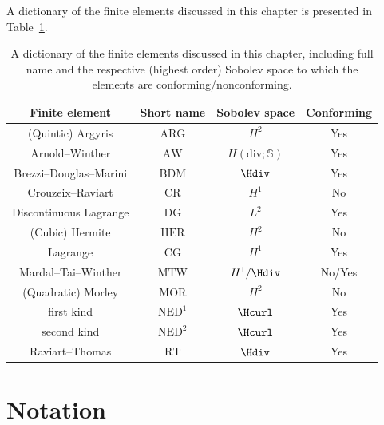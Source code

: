 A dictionary of the finite elements discussed in this chapter is
presented in Table~\ref{kirby-6:tab:overview}.
\begin{table}
  \centering
  \begin{tabular}{cccc}
    \toprule
    Finite element & Short name & Sobolev space & Conforming\\
    \midrule
    (Quintic) Argyris & $\mathrm{ARG}$ & $H^2$ &Yes \\
    Arnold--Winther & $\mathrm{AW}$ & $H(\mathrm{div}; \mathbb{S})$ &Yes \\
    Brezzi--Douglas--Marini & $\mathrm{BDM}$ & $\Hdiv$ & Yes \\
    Crouzeix--Raviart & $\mathrm{CR}$ & $H^1$ & No \\
    Discontinuous Lagrange & $\mathrm{DG}$ & $L^2$ & Yes \\
    (Cubic) Hermite & $\mathrm{HER}$ & $H^2$ & No \\
    Lagrange & $\mathrm{CG}$ & $H^1$ & Yes \\
    Mardal--Tai--Winther & $\mathrm{MTW}$ & $H^1/\Hdiv$ & No/Yes \\
    (Quadratic) Morley & $\mathrm{MOR}$ & $H^2$ & No \\
    \nedelec{} first kind & $\mathrm{NED^1}$ & $\Hcurl$ & Yes \\
    \nedelec{} second kind & $\mathrm{NED^2}$ & $\Hcurl$ & Yes \\
    Raviart--Thomas & $\mathrm{RT}$ & $\Hdiv$ & Yes \\
    \bottomrule
  \end{tabular}
  \caption{A dictionary of the finite elements discussed in this
    chapter, including full name and the respective (highest order)
    Sobolev space to which the elements are conforming/nonconforming.}
  \label{kirby-6:tab:overview}
\end{table}

\section{Notation}


